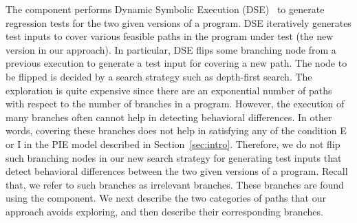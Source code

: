 The  component performs Dynamic Symbolic Execution (DSE)~\cite{Clarke:symbolic, king:symex, dart, cute, exe} to 
generate regression tests for the two given versions of a program. DSE iteratively generates test inputs to cover various feasible paths in the program under test (the new version in our approach). In particular, DSE flips some branching node from a previous execution to generate a test input for covering a new path. The node to be flipped is decided by a search strategy such as depth-first search. 
The exploration is quite expensive since there are an exponential 
number of paths with respect to the number of branches in a program.
 However, the execution of many branches often cannot help in detecting behavioral differences. 
 In other words, covering these branches does not help in satisfying any of the condition E or I in the PIE model described in Section~\ref{sec:intro}. 
 Therefore, we do not flip such branching nodes in our new search strategy for generating test inputs that detect 
 behavioral differences between the two given versions of a program. Recall that, we refer to such branches as irrelevant branches. These branches are found using the   component.
 We next describe the two categories of paths that our approach avoids exploring, and then describe their corresponding branches.
 
